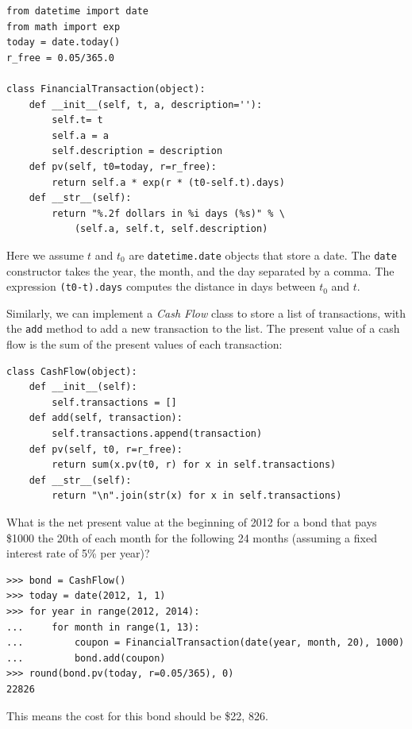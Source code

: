 \documentclass[justified, sixbynine]{tufte-book}
\def\ft{\small\tt}
\theoremstyle{plain}%
\newtheorem * {corollary}{Corollary}
\theoremstyle{definition}
\theoremstyle{remark}
\newtheorem * {remark}{Remark}
\newtheorem * {note}{Note}
\begin{document}
\begin{fullwidth}
\begin{lstlisting}
from datetime import date
from math import exp
today = date.today()
r_free = 0.05/365.0

class FinancialTransaction(object):
    def __init__(self, t, a, description=''):
        self.t= t
        self.a = a
        self.description = description
    def pv(self, t0=today, r=r_free):
        return self.a * exp(r * (t0-self.t).days)
    def __str__(self):
        return "%.2f dollars in %i days (%s)" % \
            (self.a, self.t, self.description)
\end{lstlisting}

Here we assume $t$ and $t_0$ are {\ft datetime.date} objects that store a date. The {\ft date} constructor takes the year, the month, and the day separated by a comma. The expression {\ft (t0-t).days} computes the distance in days between $t_0$ and $t$.


Similarly, we can implement a {\it Cash Flow} class to store a list of transactions, with the {\ft add} method to add a new transaction to the list. The present value of a cash flow is the sum of the present values of each transaction:


\begin{lstlisting}
class CashFlow(object):
    def __init__(self):
        self.transactions = []
    def add(self, transaction):
        self.transactions.append(transaction)
    def pv(self, t0, r=r_free):
        return sum(x.pv(t0, r) for x in self.transactions)
    def __str__(self):
        return "\n".join(str(x) for x in self.transactions)
\end{lstlisting}

What is the net present value at the beginning of 2012 for a bond that pays \$1000 the 20th of each month for the following 24 months (assuming a fixed interest rate of 5\% per year)?
\begin{lstlisting}
>>> bond = CashFlow()
>>> today = date(2012, 1, 1)
>>> for year in range(2012, 2014):
...     for month in range(1, 13):
...         coupon = FinancialTransaction(date(year, month, 20), 1000)
...         bond.add(coupon)
>>> round(bond.pv(today, r=0.05/365), 0)
22826
\end{lstlisting}

This means the cost for this bond should be \$22, 826.


\end{fullwidth}
\end{document}
